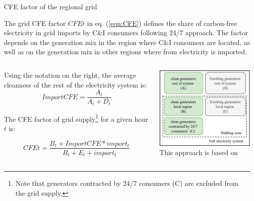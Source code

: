 \begin{frame}{CFE factor of the regional grid}

  {\small

  The \alert{grid CFE factor} $CFEt$ in eq. (\ref{eqn:CFE}) defines the share of 
  carbon-free electricity  in grid imports by C\&I consumers following 24/7 approach. 
  The factor depends on the generation mix in the region where C\&I consumers are located, 
  as well as on the generation mix in other regions where from electricity is imported. 

  \begin{columns}
    \begin{column}{8cm}

  Using the notation on the right, the average cleanness 
  of the rest of the electricity system is:
  \begin{equation*}
  ImportCFE = \frac{A_t}{A_t + D_t}
  \end{equation*}

  The CFE factor of grid supply\footnote{Note 
  that generators contracted by 24/7 consumers (C) are excluded from the grid supply.} 
  for a given hour $t$ is:
  
  \begin{equation*}
  CFEt = \frac{B_t + ImportCFE * import_t}{B_t + E_t + import_t}
  \end{equation*}    

  \end{column}

  \begin{column}{5cm}
  \centering
  \includegraphics[width=5cm]{images/cfe.png}
  {\scriptsize
  This approach is based on 
  }
  \end{column}
    
  \end{columns}

  \noindent{}
  }

\end{frame}


